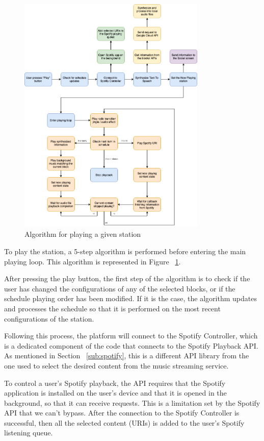 \begin{figure}[h]
\centering
\includegraphics[width=0.8\textwidth]{./Images/code/alg.png}
\caption{Algorithm for playing a given station}
\label{fig:alg}
\end{figure}


To play the station, a 5-step algorithm is performed before entering the main playing loop. This algorithm is represented in Figure ~\ref{fig:alg}.

After pressing the play button, the first step of the algorithm is to check if the user has changed the configurations of any of the selected blocks, or if the schedule playing order has been modified. If it is the case, the algorithm updates and processes the schedule so that it is performed on the most recent configurations of the station.

Following this process, the platform will connect to the Spotify Controller, which is a dedicated component of the code that connects to the Spotify Playback \ac{API}. As mentioned in Section ~\ref{sub:spotify}, this is a different \ac{API} library from the one used to select the desired content from the music streaming service.

To control a user's Spotify playback, the \ac{API} requires that the Spotify application is installed on the user's device and that it is opened in the background, so that it can receive requests. This is a limitation set by the Spotify \ac{API} that we can't bypass. After the connection to the Spotify Controller is successful, then all the selected content (\acp{URI}) is added to the user's Spotify listening queue.

